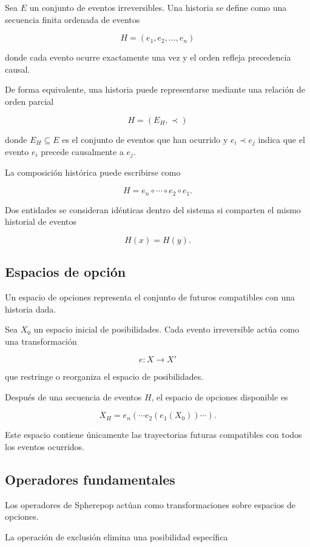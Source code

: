 \documentclass[12pt]{article}
\begin{document}
Sea \(E\) un conjunto de eventos irreversibles. Una historia se define como una secuencia finita ordenada de eventos

\[
H = (e_1,e_2,\ldots,e_n)
\]

donde cada evento ocurre exactamente una vez y el orden refleja precedencia causal.

De forma equivalente, una historia puede representarse mediante una relación de orden parcial

\[
H = (E_H,\prec)
\]

donde \(E_H \subseteq E\) es el conjunto de eventos que han ocurrido y \(e_i \prec e_j\) indica que el evento \(e_i\) precede causalmente a \(e_j\).

La composición histórica puede escribirse como

\[
H = e_n \circ \cdots \circ e_2 \circ e_1 .
\]

Dos entidades se consideran idénticas dentro del sistema si comparten el mismo historial de eventos

\[
H(x) = H(y).
\]

\subsection{Espacios de opción}

Un espacio de opciones representa el conjunto de futuros compatibles con una historia dada.

Sea \(X_0\) un espacio inicial de posibilidades. Cada evento irreversible actúa como una transformación

\[
e : X \rightarrow X'
\]

que restringe o reorganiza el espacio de posibilidades.

Después de una secuencia de eventos \(H\), el espacio de opciones disponible es

\[
X_H = e_n(\cdots e_2(e_1(X_0))\cdots).
\]

Este espacio contiene únicamente las trayectorias futuras compatibles con todos los eventos ocurridos.

\subsection{Operadores fundamentales}

Los operadores de Spherepop actúan como transformaciones sobre espacios de opciones.

La operación de exclusión elimina una posibilidad específica
\end{document}
